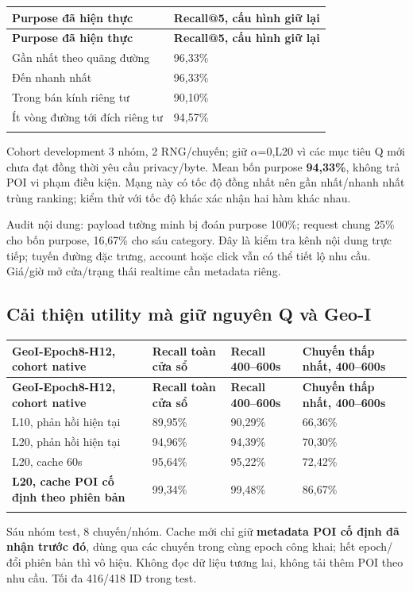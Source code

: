 \documentclass[11pt,a4paper]{article}
\begin{document}
\begingroup\small
\begin{longtable}{@{}P{11.407cm}P{5.703cm}@{}}
\toprule
\textbf{Purpose đã hiện thực} & \textbf{Recall@5, cấu hình giữ lại}\\\midrule
\endfirsthead
\toprule
\textbf{Purpose đã hiện thực} & \textbf{Recall@5, cấu hình giữ lại}\\\midrule
\endhead\bottomrule\endfoot
Gần nhất theo quãng đường & 96,33\%\\
\addlinespace[2pt]
Đến nhanh nhất & 96,33\%\\
\addlinespace[2pt]
Trong bán kính riêng tư & 90,10\%\\
\addlinespace[2pt]
Ít vòng đường tới đích riêng tư & 94,57\%\\
\addlinespace[2pt]
\end{longtable}
\endgroup
Cohort development 3 nhóm, 2 RNG/chuyến; giữ $\alpha$=0,L20 vì các mục tiêu Q mới chưa đạt đồng thời yêu cầu privacy/byte. Mean bốn purpose \textbf{94,33\%}, không trả POI vi phạm điều kiện. Mạng này có tốc độ đồng nhất nên gần nhất/nhanh nhất trùng ranking; kiểm thử với tốc độ khác xác nhận hai hàm khác nhau.

Audit nội dung: payload tường minh bị đoán purpose 100\%; request chung 25\% cho bốn purpose, 16,67\% cho sáu category. Đây là kiểm tra kênh nội dung trực tiếp; tuyến đường đặc trưng, account hoặc click vẫn có thể tiết lộ nhu cầu. Giá/giờ mở cửa/trạng thái realtime cần metadata riêng.

\subsection*{Cải thiện utility mà giữ nguyên Q và Geo-I}
\begingroup\small
\begin{longtable}{@{}P{6.358cm}P{3.179cm}P{3.179cm}P{3.815cm}@{}}
\toprule
\textbf{GeoI-Epoch8-H12, cohort native} & \textbf{Recall toàn cửa sổ} & \textbf{Recall 400–600s} & \textbf{Chuyến thấp nhất, 400–600s}\\\midrule
\endfirsthead
\toprule
\textbf{GeoI-Epoch8-H12, cohort native} & \textbf{Recall toàn cửa sổ} & \textbf{Recall 400–600s} & \textbf{Chuyến thấp nhất, 400–600s}\\\midrule
\endhead\bottomrule\endfoot
L10, phản hồi hiện tại & 89,95\% & 90,29\% & 66,36\%\\
\addlinespace[2pt]
L20, phản hồi hiện tại & 94,96\% & 94,39\% & 70,30\%\\
\addlinespace[2pt]
L20, cache 60s & 95,64\% & 95,22\% & 72,42\%\\
\addlinespace[2pt]
\textbf{L20, cache POI cố định theo phiên bản} & 99,34\% & 99,48\% & 86,67\%\\
\addlinespace[2pt]
\end{longtable}
\endgroup
Sáu nhóm test, 8 chuyến/nhóm. Cache mới chỉ giữ \textbf{metadata POI cố định đã nhận trước đó}, dùng qua các chuyến trong cùng epoch công khai; hết epoch/đổi phiên bản thì vô hiệu. Không đọc dữ liệu tương lai, không tải thêm POI theo nhu cầu. Tối đa 416/418 ID trong test.
\end{document}
